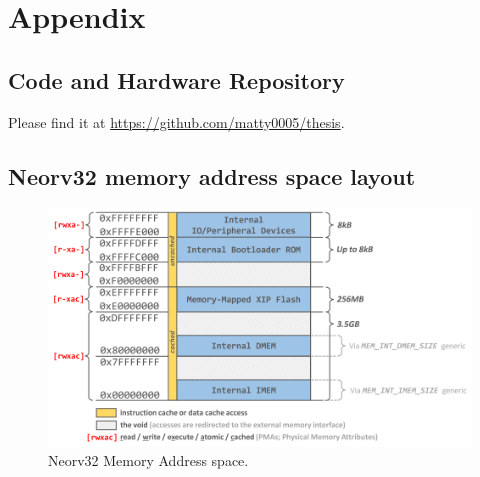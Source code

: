 \chapter{Appendix}

\section{Code and Hardware Repository}
Please find it at \url{https://github.com/matty0005/thesis}.


\section{Neorv32 memory address space layout}
\label{app:mem_address}
\begin{figure}[h!]
    \centering
    \includegraphics[width=1\textwidth]{Images/neorv32_address_space.png}
    \caption{Neorv32 Memory Address space.}
\end{figure}



